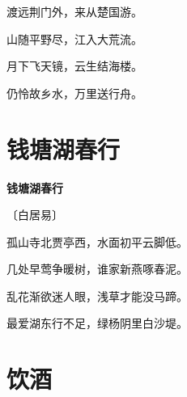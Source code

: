 \documentclass[12pt,UTF-8,openany,fontset=none]{ctexbook}
\begin{document}
\begin{center}
    \begin{Large}

        渡远荆门外，来从楚国游。

        山随平野尽，江入大荒流。

        月下飞天镜，云生结海楼。

        仍怜故乡水，万里送行舟。

    \end{Large}

\end{center}

\vspace{8pt}
\clearpage

\section{钱塘湖春行}


\begin{center}
    {\bfseries 钱塘湖春行}

    \vspace{18pt}

    \begin{large}\xuwen
        〔白居易〕
    \end{large}

\end{center}

    \vspace{18pt}  %

\begin{center}
    \begin{Large}

        孤山寺北贾亭西，水面初平云脚低。

        几处早莺争暖树，谁家新燕啄春泥。

        乱花渐欲迷人眼，浅草才能没马蹄。

        最爱湖东行不足，绿杨阴里白沙堤。

    \end{Large}

\end{center}

\vspace{8pt}
\clearpage

\section{饮酒}
\end{document}
